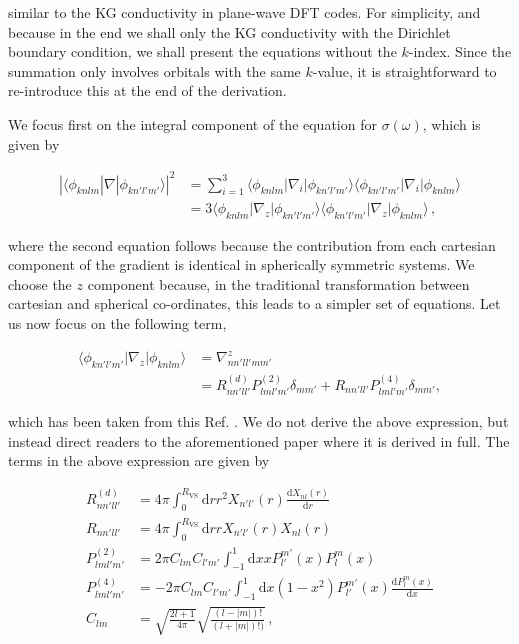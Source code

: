 \documentclass[11pt]{article}
\begin{document}
similar to the KG conductivity in plane-wave DFT codes. For simplicity,
and because in the end we shall only the KG conductivity with the
Dirichlet boundary condition, we shall present the equations without the
\(k\)-index. Since the summation only involves orbitals with the same
\(k\)-value, it is straightforward to re-introduce this at the end of
the derivation.

We focus first on the integral component of the equation for
\(\sigma(\omega)\), which is given by

\begin{align}
|\langle \phi_{knlm} | \nabla | \phi_{kn'l'm'} \rangle|^2 &= \sum_{i=1}^3 \langle \phi_{knlm} | \nabla_i | \phi_{kn'l'm'} \rangle \langle \phi_{kn'l'm'} | \nabla_i | \phi_{knlm} \rangle \\
&=3 \langle \phi_{knlm} | \nabla_z | \phi_{kn'l'm'} \rangle \langle \phi_{kn'l'm'} | \nabla_z | \phi_{knlm} \rangle\,,
\end{align}

where the second equation follows because the contribution from each
cartesian component of the gradient is identical in spherically
symmetric systems. We choose the \(z\) component because, in the
traditional transformation between cartesian and spherical co-ordinates,
this leads to a simpler set of equations. Let us now focus on the
following term,

\begin{align}
\langle \phi_{kn'l'm'} | \nabla_z | \phi_{knlm} \rangle&= \nabla_{nn'll'mm'}^z \\
&=R^{(d)}_{nn'll'} P^{(2)}_{lml'm'} \delta_{mm'} + R_{nn'll'} P^{(4)}_{lml'm'} \delta_{mm'},
\end{align}

which has been taken from this Ref. .
We do not derive the above expression, but instead direct readers to the
aforementioned paper where it is derived in full. The terms in the above
expression are given by

\begin{align}
R^{(d)}_{nn'll'} &= 4\pi\int_0^{R_\textrm{VS}} \textrm{d}r r^2 X_{n'l'}(r) \frac{\textrm{d}X_{nl}(r)}{\textrm{d}r}\\
 R_{nn'll'} &= 4\pi\int_0^{R_\textrm{VS}} \textrm{d}r r X_{n'l'}(r) X_{nl}(r) \\
 P^{(2)}_{lml'm'} &= 2\pi C_{lm}C_{l'm'} \int_{-1}^{1} \textrm{d}x x P_{l'}^{m'} (x) P_{l}^{m}(x) \\
 P^{(4)}_{lml'm'} &= -2\pi C_{lm}C_{l'm'} \int_{-1}^{1} \textrm{d}x (1-x^2) P_{l'}^{m'} (x) \frac{\textrm{d}P_l^m(x)}{\textrm{d}x}\\
 C_{lm} &= \sqrt{\frac{2l+1}{4\pi}}\sqrt{\frac{(l-|m|)!}{(l+|m|)!)}}\,,
\end{align}
\end{document}
